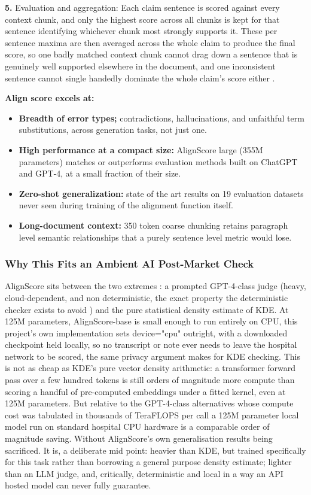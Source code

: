 \documentclass[11pt,a4paper]{article}
\begin{document}
 \textbf{5.} Evaluation and aggregation: Each claim sentence is scored against every context chunk, and only the highest score across all chunks is kept for that sentence identifying whichever chunk most strongly supports it. These per sentence maxima are then averaged across the whole claim to produce the final score, so one badly matched context chunk cannot drag down a sentence that is genuinely well supported elsewhere in the document, and one inconsistent sentence cannot single handedly dominate the whole claim's score either \cite{zha2023alignscore} .

\textbf{Align score excels at: }

\begin{itemize}
    \item \textbf{Breadth of error types;}  contradictions, hallucinations, and unfaithful term substitutions, across generation tasks, not just one.
    \item  \textbf{High performance at a compact size:} AlignScore large (355M parameters) matches or outperforms evaluation methods built on ChatGPT and GPT-4, at a small fraction of their size. \cite{zha2023alignscore}
    \item  \textbf{Zero-shot generalization:} state of the art results on 19 evaluation datasets never seen during training of the alignment function itself. 
    \item \textbf{Long-document context:} 350 token coarse chunking retains paragraph level semantic relationships that a purely sentence level metric would lose.
\end{itemize}

\subsubsection{Why This Fits an Ambient AI Post-Market Check}

 AlignScore sits between the two extremes : a prompted GPT-4-class judge (heavy, cloud-dependent, and non deterministic, the exact property the deterministic checker exists to avoid ) and the pure statistical density estimate of KDE. At 125M parameters, AlignScore-base is small enough to run entirely on CPU, this project's own implementation sets device="cpu" outright, with a downloaded checkpoint held locally, so no transcript or note ever needs to leave the hospital network to be scored, the same privacy argument  makes for KDE checking. This is not as cheap as KDE's pure vector density arithmetic: a transformer forward pass over a few hundred tokens is still orders of magnitude more compute than scoring a handful of pre-computed embeddings under a fitted kernel, even at 125M parameters. But relative to the GPT-4-class alternatives whose compute cost was tabulated in  thousands of TeraFLOPS per call  a 125M parameter local model run on standard hospital CPU hardware is a comparable order of magnitude saving. Without AlignScore's own generalisation results  being sacrificed. It is, a deliberate mid point: heavier than KDE, but trained specifically for this task rather than borrowing a general purpose density estimate; lighter than an LLM judge, and, critically, deterministic and local in a way an API hosted model can never fully guarantee.
\end{document}
